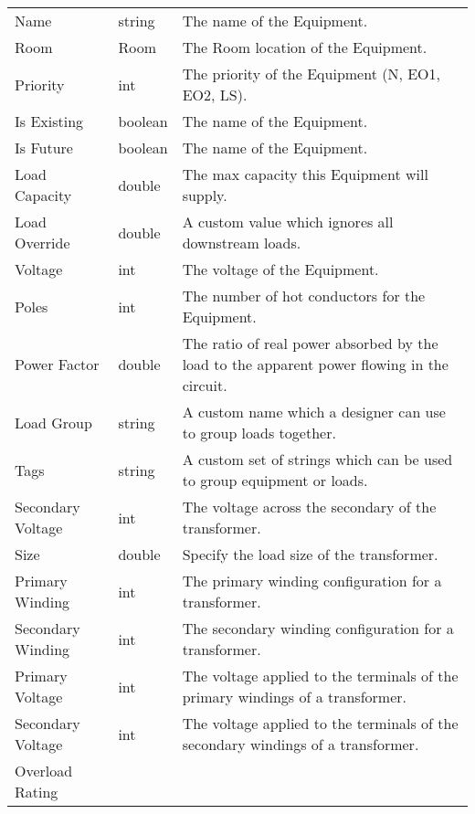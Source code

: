 \documentclass[letterpaper,10pt,english]{sphinxmanual}
\begin{document}
\begin{savenotes}\sphinxattablestart
\centering
\begin{tabulary}{\linewidth}[t]{|T|T|T|}
\hline
\sphinxstyletheadfamily 
{}
&\sphinxstyletheadfamily 
{}
&\sphinxstyletheadfamily 
{}
\\
\hline
Name
&
string
&
The name of the Equipment.
\\
\hline
Room
&
Room
&
The Room location of the Equipment.
\\
\hline
Priority
&
int
&
The priority of the Equipment (N, EO1, EO2, LS).
\\
\hline
Is Existing
&
boolean
&
The name of the Equipment.
\\
\hline
Is Future
&
boolean
&
The name of the Equipment.
\\
\hline
Load Capacity
&
double
&
The max capacity this Equipment will supply.
\\
\hline
Load Override
&
double
&
A custom value which ignores all downstream loads.
\\
\hline
Voltage
&
int
&
The voltage of the Equipment.
\\
\hline
Poles
&
int
&
The number of hot conductors for the Equipment.
\\
\hline
Power Factor
&
double
&
The ratio of real power absorbed by the load to the apparent power flowing in the circuit.
\\
\hline
Load Group
&
string
&
A custom name which a designer can use to group loads together.
\\
\hline
Tags
&
string
&
A custom set of strings which can be used to group equipment or loads.
\\
\hline
Secondary Voltage
&
int
&
The voltage across the secondary of the transformer.
\\
\hline
Size
&
double
&
Specify the load size of the transformer.
\\
\hline
Primary Winding
&
int
&
The primary winding configuration for a transformer.
\\
\hline
Secondary Winding
&
int
&
The secondary winding configuration for a transformer.
\\
\hline
Primary Voltage
&
int
&
The voltage applied to the terminals of the primary windings of a transformer.
\\
\hline
Secondary Voltage
&
int
&
The voltage applied to the terminals of the secondary windings of a transformer.
\\
\hline
Overload Rating

\end{tabulary}
\end{savenotes}
\end{document}
